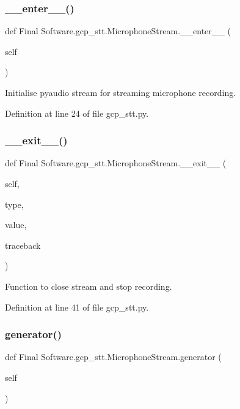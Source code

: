 \subsubsection{\_\_enter\_\_()}
{\footnotesize\ttfamily def Final Software.\+gcp\+\_\+stt.\+Microphone\+Stream.\+\_\+\+\_\+enter\+\_\+\+\_\+ (\begin{DoxyParamCaption}\item[{}]{self }\end{DoxyParamCaption})}



Initialise pyaudio stream for streaming microphone recording. 



Definition at line 24 of file gcp\+\_\+stt.\+py.

\mbox{\label{class_final_01_software_1_1gcp__stt_1_1_microphone_stream_ab0a39b62625fab017defd3477f3b1aff}} 
\subsubsection{\_\_exit\_\_()}
{\footnotesize\ttfamily def Final Software.\+gcp\+\_\+stt.\+Microphone\+Stream.\+\_\+\+\_\+exit\+\_\+\+\_\+ (\begin{DoxyParamCaption}\item[{}]{self,  }\item[{}]{type,  }\item[{}]{value,  }\item[{}]{traceback }\end{DoxyParamCaption})}



Function to close stream and stop recording. 



Definition at line 41 of file gcp\+\_\+stt.\+py.

\mbox{\label{class_final_01_software_1_1gcp__stt_1_1_microphone_stream_aa199194eedb8f0e47b1a5bc088518df3}} 
\subsubsection{generator()}
{\footnotesize\ttfamily def Final Software.\+gcp\+\_\+stt.\+Microphone\+Stream.\+generator (\begin{DoxyParamCaption}\item[{}]{self }\end{DoxyParamCaption})}



